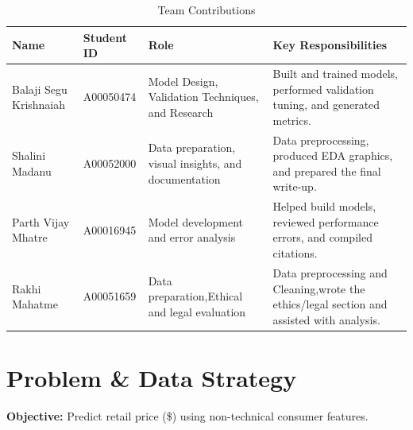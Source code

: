 \documentclass[11pt, a4paper]{article}
\begin{document}
\begin{table}[H]
    \centering
    \scriptsize %
    \setlength{\tabcolsep}{4pt}
    \renewcommand{\arraystretch}{1.2} %

    \begin{tabularx}{\textwidth}{@{} p{2.5cm} l p{4.5cm} X @{}}
        \toprule
        \textbf{Name} & \textbf{Student ID} & \textbf{Role} & \textbf{Key Responsibilities} \\
        \midrule

        Balaji Segu Krishnaiah 
        & A00050474 
        & Model Design, Validation Techniques, and Research 
        & Built and trained models, performed validation tuning, and generated metrics. \\
        \midrule

        Shalini Madanu 
        & A00052000 
        & Data preparation, visual insights, and documentation 
        &  Data preprocessing, produced EDA graphics, and prepared the final write-up. \\
        \midrule

        Parth Vijay Mhatre 
        & A00016945 
        & Model development and error analysis 
        & Helped build models, reviewed performance errors, and compiled citations. \\
        \midrule

        Rakhi Mahatme 
        & A00051659 
        &  Data preparation,Ethical and legal evaluation 
        & Data preprocessing and Cleaning,wrote the ethics/legal section and assisted with analysis. \\
        \bottomrule
    \end{tabularx}
    \caption{Team Contributions}
\end{table}



\section{Problem \& Data Strategy}
\textbf{Objective:} Predict retail price (\$) using non-technical consumer features.
\end{document}
